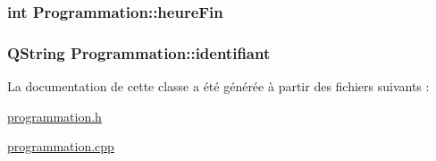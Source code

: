 \subsubsection[{heure\+Fin}]{\setlength{\rightskip}{0pt plus 5cm}int Programmation\+::heure\+Fin\hspace{0.3cm}{\ttfamily [protected]}}\label{class_programmation_a6a807cdfb835c2440834ea04e1ef9d40}
\hypertarget{class_programmation_aea36cbc16a71cead5fed20ce8b7670fc}{}
\subsubsection[{identifiant}]{\setlength{\rightskip}{0pt plus 5cm}Q\+String Programmation\+::identifiant\hspace{0.3cm}{\ttfamily [protected]}}\label{class_programmation_aea36cbc16a71cead5fed20ce8b7670fc}


La documentation de cette classe a été générée à partir des fichiers suivants \+:\begin{DoxyCompactItemize}
\item 
\hyperlink{programmation_8h}{programmation.\+h}\item 
\hyperlink{programmation_8cpp}{programmation.\+cpp}\end{DoxyCompactItemize}
